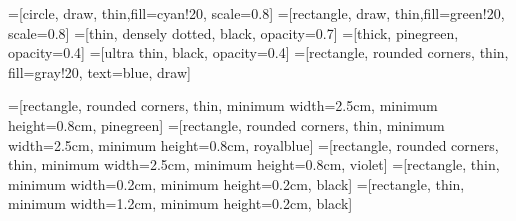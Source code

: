 =[circle, draw, thin,fill=cyan!20, scale=0.8]
=[rectangle, draw, thin,fill=green!20, scale=0.8]
=[thin, densely dotted, black, opacity=0.7]
=[thick, pinegreen, opacity=0.4]
=[ultra thin, black, opacity=0.4]
=[rectangle, rounded corners, thin, 
                       fill=gray!20, text=blue, draw]
                        
=[rectangle, rounded corners, thin,
                           minimum width=2.5cm, minimum height=0.8cm,
                           pinegreen]
=[rectangle, rounded corners, thin,
                          minimum width=2.5cm, minimum height=0.8cm,
                          royalblue]
=[rectangle, rounded corners, thin,
                          minimum width=2.5cm, minimum height=0.8cm,
                          violet]
=[rectangle, thin,
                          minimum width=0.2cm, minimum height=0.2cm,
                          black]
=[rectangle, thin,
                          minimum width=1.2cm, minimum height=0.2cm,
                          black]

